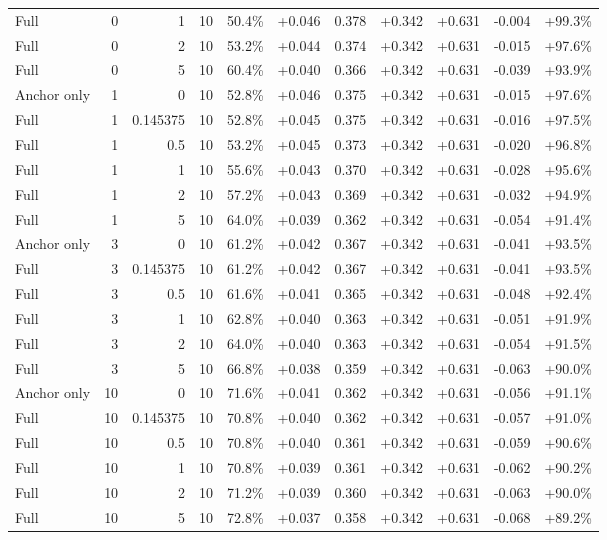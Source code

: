 \begin{table}[htbp]
\begin{tabular}{lrrrccccccc}
Full & 0 & 1 & 10 & 50.4\% & +0.046 & 0.378 & +0.342 & +0.631 & -0.004 & +99.3\% \\
Full & 0 & 2 & 10 & 53.2\% & +0.044 & 0.374 & +0.342 & +0.631 & -0.015 & +97.6\% \\
Full & 0 & 5 & 10 & 60.4\% & +0.040 & 0.366 & +0.342 & +0.631 & -0.039 & +93.9\% \\
Anchor only & 1 & 0 & 10 & 52.8\% & +0.046 & 0.375 & +0.342 & +0.631 & -0.015 & +97.6\% \\
Full & 1 & 0.145375 & 10 & 52.8\% & +0.045 & 0.375 & +0.342 & +0.631 & -0.016 & +97.5\% \\
Full & 1 & 0.5 & 10 & 53.2\% & +0.045 & 0.373 & +0.342 & +0.631 & -0.020 & +96.8\% \\
Full & 1 & 1 & 10 & 55.6\% & +0.043 & 0.370 & +0.342 & +0.631 & -0.028 & +95.6\% \\
Full & 1 & 2 & 10 & 57.2\% & +0.043 & 0.369 & +0.342 & +0.631 & -0.032 & +94.9\% \\
Full & 1 & 5 & 10 & 64.0\% & +0.039 & 0.362 & +0.342 & +0.631 & -0.054 & +91.4\% \\
Anchor only & 3 & 0 & 10 & 61.2\% & +0.042 & 0.367 & +0.342 & +0.631 & -0.041 & +93.5\% \\
Full & 3 & 0.145375 & 10 & 61.2\% & +0.042 & 0.367 & +0.342 & +0.631 & -0.041 & +93.5\% \\
Full & 3 & 0.5 & 10 & 61.6\% & +0.041 & 0.365 & +0.342 & +0.631 & -0.048 & +92.4\% \\
Full & 3 & 1 & 10 & 62.8\% & +0.040 & 0.363 & +0.342 & +0.631 & -0.051 & +91.9\% \\
Full & 3 & 2 & 10 & 64.0\% & +0.040 & 0.363 & +0.342 & +0.631 & -0.054 & +91.5\% \\
Full & 3 & 5 & 10 & 66.8\% & +0.038 & 0.359 & +0.342 & +0.631 & -0.063 & +90.0\% \\
Anchor only & 10 & 0 & 10 & 71.6\% & +0.041 & 0.362 & +0.342 & +0.631 & -0.056 & +91.1\% \\
Full & 10 & 0.145375 & 10 & 70.8\% & +0.040 & 0.362 & +0.342 & +0.631 & -0.057 & +91.0\% \\
Full & 10 & 0.5 & 10 & 70.8\% & +0.040 & 0.361 & +0.342 & +0.631 & -0.059 & +90.6\% \\
Full & 10 & 1 & 10 & 70.8\% & +0.039 & 0.361 & +0.342 & +0.631 & -0.062 & +90.2\% \\
Full & 10 & 2 & 10 & 71.2\% & +0.039 & 0.360 & +0.342 & +0.631 & -0.063 & +90.0\% \\
Full & 10 & 5 & 10 & 72.8\% & +0.037 & 0.358 & +0.342 & +0.631 & -0.068 & +89.2\% \\

\end{tabular}
\end{table}
